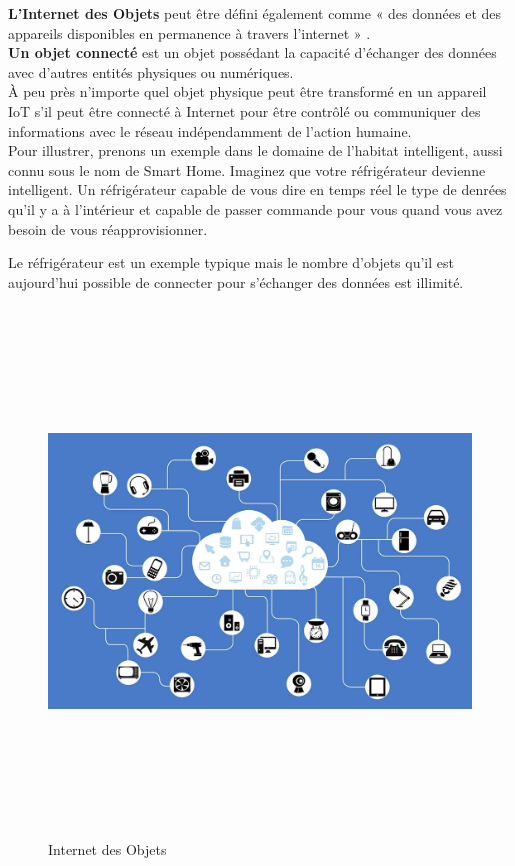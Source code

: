 \textbf{L’Internet des Objets} peut être déf{\kern0pt}ini également comme « des données et des appareils disponibles en permanence à travers l’internet » \cite{hu2016security}.\\

\textbf{Un objet connecté} est un objet possédant la capacité d’échanger des données avec d’autres entités physiques ou numériques.\\

À peu près n'importe quel objet physique peut être transformé en un appareil IoT s'il peut être connecté à Internet pour être contrôlé ou communiquer des informations avec le réseau indépendamment de l’action humaine.\\

Pour illustrer, prenons un exemple dans le domaine de l’habitat intelligent, aussi connu sous le nom de Smart Home. Imaginez que votre réfrigérateur devienne intelligent. Un réfrigérateur capable de vous dire en temps réel le type de denrées qu’il y a à l’intérieur et capable de passer commande pour vous quand vous avez besoin de vous réapprovisionner.

Le réfrigérateur est un exemple typique mais le nombre d’objets qu’il est aujourd’hui possible de connecter pour s’échanger des données est illimité.\\

	\begin{figure}[H]
		\begin{center}
			\includegraphics[width=16cm,height=14cm]{IMAGES/ORIGINALS/Internet_des_Objets_2}
		\end{center}
		\caption{Internet des Objets}
	\end{figure}
	
